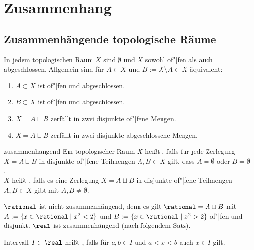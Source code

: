 \section{%
    Zusammenhang%
}

\subsection{%
    Zusammenhängende topologische Räume%
}

\begin{Bem}
    In jedem topologischen Raum $X$ sind $\emptyset$ und $X$ sowohl of"|fen
    als auch abgeschlossen.
    Allgemein sind für $A \subset X$ und $B := X \setminus A \subset X$
    äquivalent:
    \begin{enumerate}
        \item
        $A \subset X$ ist of"|fen und abgeschlossen.

        \item
        $B \subset X$ ist of"|fen und abgeschlossen.

        \item
        $X = A \sqcup B$ zerfällt in zwei disjunkte of"|fene Mengen.

        \item
        $X = A \sqcup B$ zerfällt in zwei disjunkte abgeschlossene Mengen.
    \end{enumerate}
\end{Bem}

\begin{Def}{zusammenhängend}
    Ein topologischer Raum $X$ heißt
    , falls für jede Zerlegung
    $X = A \sqcup B$ in disjunkte of"|fene Teilmengen $A, B \subset X$ gilt,
    dass $A = \emptyset$ oder $B = \emptyset$. \\
    $X$ heißt , falls es eine Zerlegung
    $X = A \sqcup B$ in disjunkte of"|fene Teilmengen $A, B \subset X$ gibt
    mit $A, B \not= \emptyset$.
\end{Def}

\begin{Bsp}
    $\rational$ ist nicht zusammenhängend, denn es gilt
    $\rational = A \sqcup B$ mit $A := \{x \in \rational \;|\; x^2 < 2\}$
    und $B := \{x \in \rational \;|\; x^2 > 2\}$ of"|fen und disjunkt.
    $\real$ ist zusammenhängend (nach folgendem Satz).
\end{Bsp}

\linie

\begin{Def}{Intervall}
    $I \subset \real$ heißt , falls
    für $a, b \in I$ und $a < x < b$ auch $x \in I$ gilt.
\end{Def}

